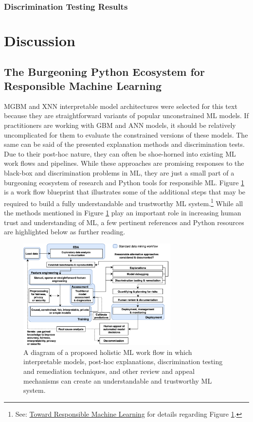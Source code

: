 \documentclass[information,article,submit,moreauthors,pdftex]{definitions/mdpi}
\begin{document}
{\subsubsection{Discrimination Testing Results}\label{ssec:dis_mort}

\section{Discussion}\label{sec:disc}

\subsection{The Burgeoning Python Ecosystem for Responsible Machine Learning}

MGBM and XNN interpretable model architectures were selected for this text because they are straightforward variants of popular unconstrained ML models. If practitioners are working with GBM and ANN models, it should be relatively uncomplicated for them to evaluate the constrained versions of these models. The same can be said of the presented explanation methods and discrimination tests. Due to their post-hoc nature, they can often be shoe-horned into existing ML work flows and pipelines. While these approaches are promising responses to the black-box and discrimination problems in ML, they are just a small part of a burgeoning ecosystem of research and Python tools for responsible ML. Figure \ref{fig:blueprint} is a work flow blueprint that illustrates some of the additional steps that may be required to build a fully understandable and trustworthy ML system.\footnote{See: \href{https://github.com/jphall663/hc_ml}{Toward Responsible Machine Learning} for details regarding Figure \ref{fig:blueprint}.} While all the methods mentioned in Figure \ref{fig:blueprint} play an important role in increasing human trust and understanding of ML, a few pertinent references and Python resources are highlighted below as further reading. 

\begin{figure}[H]
\centering
\includegraphics[width=8cm]{img/blueprint.png}
\caption{A diagram of a proposed holistic ML work flow in which interpretable models, post-hoc explanations, discrimination testing and remediation techniques, and other review and appeal mechanisms can create an understandable and trustworthy ML system.}
\label{fig:blueprint}
\end{figure}   

}
\end{document}
